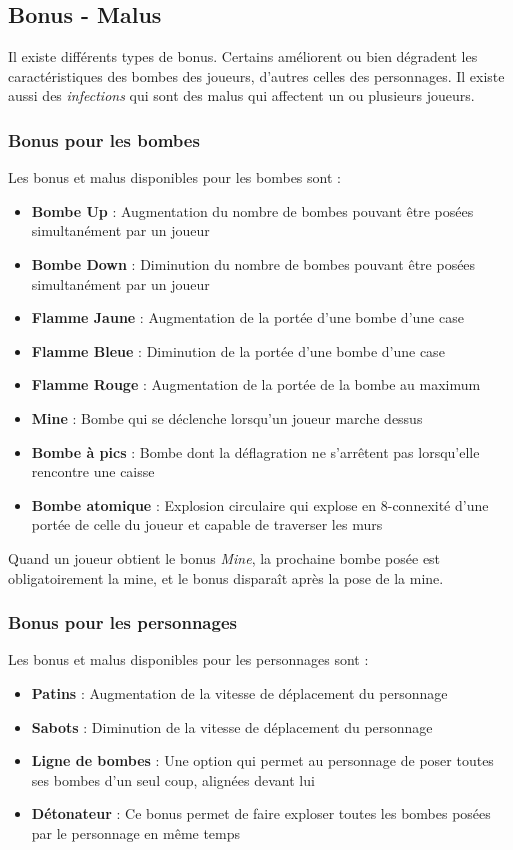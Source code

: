 \subsection{Bonus - Malus}

Il existe différents types de bonus. Certains améliorent ou bien dégradent les caractéristiques des bombes des joueurs, d'autres celles des personnages. Il existe aussi des \textit{infections} qui sont des malus qui affectent un ou plusieurs joueurs.

\subsubsection{Bonus pour les bombes}

Les bonus et malus disponibles pour les bombes sont :
\begin{itemize}
\item \textbf{Bombe Up} : Augmentation du nombre de bombes pouvant être posées simultanément par un joueur
\item \textbf{Bombe Down} : Diminution du nombre de bombes pouvant être posées simultanément par un joueur
\item \textbf{Flamme Jaune} : Augmentation de la portée d'une bombe d'une case
\item \textbf{Flamme Bleue} : Diminution de la portée d'une bombe d'une case
\item \textbf{Flamme Rouge} : Augmentation de la portée de la bombe au maximum
\item \textbf{Mine} : Bombe qui se déclenche lorsqu'un joueur marche dessus
\item \textbf{Bombe à pics} : Bombe dont la déflagration ne s'arrêtent pas lorsqu'elle rencontre une caisse
\item \textbf{Bombe atomique} : Explosion circulaire qui explose en 8-connexité d'une portée de celle du joueur et capable de traverser les murs
\end{itemize}

\vspace{0.3cm}

Quand un joueur obtient le bonus \textit{Mine}, la prochaine bombe posée est obligatoirement la mine, et le bonus disparaît après la pose de la mine.

\subsubsection{Bonus pour les personnages}

Les bonus et malus disponibles pour les personnages sont :
\begin{itemize}
\item \textbf{Patins} : Augmentation de la vitesse de déplacement du personnage
\item \textbf{Sabots} : Diminution de la vitesse de déplacement du personnage
\item \textbf{Ligne de bombes} : Une option qui permet au personnage de poser toutes ses bombes d'un seul coup, alignées devant lui
\item \textbf{Détonateur} : Ce bonus permet de faire exploser toutes les bombes posées par le personnage en même temps
\end{itemize}

